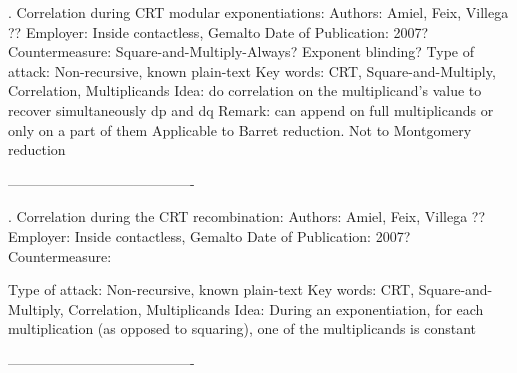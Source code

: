 . Correlation during CRT modular exponentiations:
Authors: 
	                                	                                                                          Amiel, Feix, Villega ??
Employer:
                                                                                       			 Inside contactless, Gemalto
Date of Publication:
       			                             						         2007?
Countermeasure:
                                                                                    Square-and-Multiply-Always? Exponent blinding?
Type of attack:
								       Non-recursive,  known plain-text
Key words:
			             	             CRT, Square-and-Multiply, Correlation, Multiplicands
Idea:
	                         do correlation on the multiplicand's value to recover simultaneously dp and dq
Remark: 
					can append on full multiplicands or only on a part of them                          	                                                     Applicable to Barret reduction. Not to Montgomery reduction





----------------------------------------





. Correlation during the CRT recombination:
Authors: 
	                                	                                                                          Amiel, Feix, Villega ??
Employer:
                                                                                       			 Inside contactless, Gemalto
Date of Publication:
       			                             						         2007?
Countermeasure:
                                                                                     
Type of attack:
								       Non-recursive, known plain-text
Key words:
			             	             CRT, Square-and-Multiply, Correlation, Multiplicands
Idea:
	                             During an exponentiation, for each multiplication (as opposed to squaring), 
                                                                                                          one of the multiplicands is constant 	              

                                       


                                       

----------------------------------------









